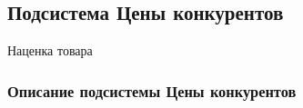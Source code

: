 \subsection{Подсистема Цены конкурентов} \hypertarget{5_1}{Наценка товара}
\subsubsection{Описание подсистемы Цены конкурентов}